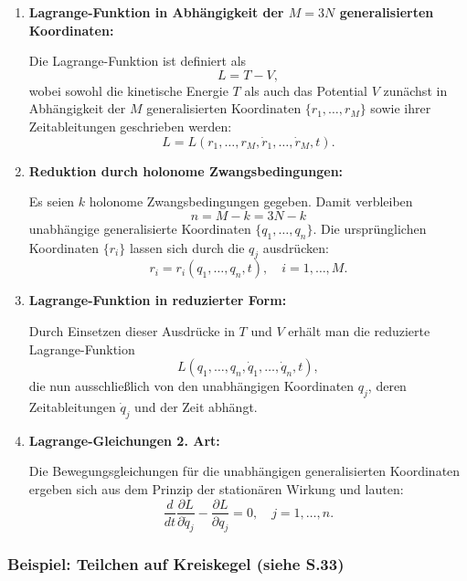 \documentclass[10pt, letterpaper]{article}
\begin{document}
\begin{enumerate}[label=\textbf{\arabic*)}, itemsep=1.5em]

  \item \textbf{Lagrange-Funktion in Abhängigkeit der $M = 3N$ generalisierten Koordinaten:}

  Die Lagrange-Funktion ist definiert als
  \[
  L = T - V,
  \]
  wobei sowohl die kinetische Energie \( T \) als auch das Potential \( V \) zunächst in Abhängigkeit der $M$ generalisierten Koordinaten \( \{ r_1, \dotsc, r_M \} \) sowie ihrer Zeitableitungen geschrieben werden:
  \[
  L = L(r_1, \dotsc, r_M, \dot{r}_1, \dotsc, \dot{r}_M, t).
  \]

  \item \textbf{Reduktion durch holonome Zwangsbedingungen:}

  Es seien \( k \) holonome Zwangsbedingungen gegeben. Damit verbleiben
  \[
  n = M - k = 3N - k
  \]
  unabhängige generalisierte Koordinaten \( \{ q_1, \dotsc, q_n \} \). Die ursprünglichen Koordinaten \( \{ r_i \} \) lassen sich durch die \( q_j \) ausdrücken:
  \[
  r_i = r_i(q_1, \dotsc, q_n, t), \quad i = 1, \dotsc, M.
  \]

  \item \textbf{Lagrange-Funktion in reduzierter Form:}

  Durch Einsetzen dieser Ausdrücke in \( T \) und \( V \) erhält man die reduzierte Lagrange-Funktion
  \[
  L(q_1, \dotsc, q_n, \dot{q}_1, \dotsc, \dot{q}_n, t),
  \]
  die nun ausschließlich von den unabhängigen Koordinaten \( q_j \), deren Zeitableitungen \( \dot{q}_j \) und der Zeit abhängt.

  \item \textbf{Lagrange-Gleichungen 2. Art:}

  Die Bewegungsgleichungen für die unabhängigen generalisierten Koordinaten ergeben sich aus dem Prinzip der stationären Wirkung und lauten:
  \[
  \frac{d}{dt} \frac{\partial L}{\partial \dot{q}_j} - \frac{\partial L}{\partial q_j} = 0,
  \quad j = 1, \dotsc, n.
  \]

\end{enumerate}




\subsubsection{Beispiel: Teilchen auf Kreiskegel (siehe S.33)}

\begin{center}
\end{center}
\end{document}
